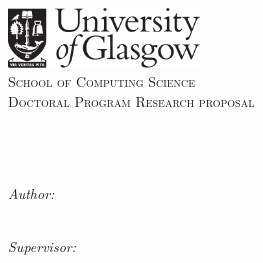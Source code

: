 \begin{titlepage}
\begin{center}

\includegraphics[width=2in]{gulogo_black}~\\[1cm]

\textsc{\LARGE School of Computing Science}\\[1.5cm]
\textsc{\Large Doctoral Program Research proposal}\\[0.5cm]

\makeatletter
\HRule \\[0.4cm]
{ \huge \bfseries \@title \\[0.4cm] }
\makeatother
\HRule \\[1.5cm]

\noindent
%
%
%
\begin{minipage}{0.4\textwidth}
\begin{flushleft} \large
\emph{Author:}\\
\makeatletter
\Large \@author\\
\texttt{\@studentid}
\makeatother
\end{flushleft}
\end{minipage}%
\begin{minipage}{0.4\textwidth}
%
%
%
\begin{flushright} \large
\emph{Supervisor:} \\
\makeatletter
\Large \@supervisor
\makeatother
\end{flushright}
\end{minipage}
\end{center}
\vspace{1cm}
\tableofcontents
\end{titlepage}